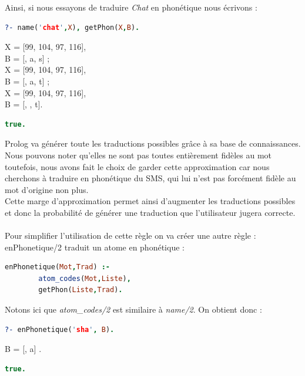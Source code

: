 \documentclass[11pt]{report}
\begin{document}
	Ainsi, si nous essayons de traduire {\em Chat} en phonétique nous écrivons :
	\begin{lstlisting}[language=Prolog]
	?- name('chat',X), getPhon(X,B).
	\end{lstlisting}
	\indent \indent \indent \indent X = [99, 104, 97, 116],\\
	\indent \indent \indent B = [, a, s] ;\\
	\indent \indent \indent X = [99, 104, 97, 116],\\
	\indent \indent \indent B = [, a, t] ;\\
	\indent \indent \indent X = [99, 104, 97, 116],\\
	\indent \indent \indent B = [, , t].\\
	\begin{lstlisting}[language=Prolog]
	true.
	\end{lstlisting}
	
	Prolog va générer toute les traductions possibles grâce à sa base de connaissances. Nous pouvons noter qu'elles ne sont pas toutes entièrement fidèles au mot toutefois, nous avons fait le choix de garder cette approximation car nous cherchons à traduire en phonétique du SMS, qui lui n'est pas forcément fidèle au mot d'origine non plus.\\
	Cette marge d'approximation permet ainsi d'augmenter les traductions possibles et donc la probabilité de générer une traduction que l'utilisateur jugera correcte.
	\paragraph{}
	Pour simplifier l'utilisation de cette règle on va créer une autre règle :\\
	enPhonetique/2 traduit un atome en phonétique :
	\begin{lstlisting}[language=Prolog]
	enPhonetique(Mot,Trad) :-
		atom_codes(Mot,Liste),
		getPhon(Liste,Trad).
	\end{lstlisting}
	
	Notons ici que {\em atom\_codes/2} est similaire à {\em name/2}. On obtient donc :
	\begin{lstlisting}[language=Prolog]
	?- enPhonetique('sha', B).
	\end{lstlisting}
	\indent \indent \indent \indent  B = [, a] .
	\begin{lstlisting}[language=Prolog]
	true.
	\end{lstlisting}
	
\end{document}

